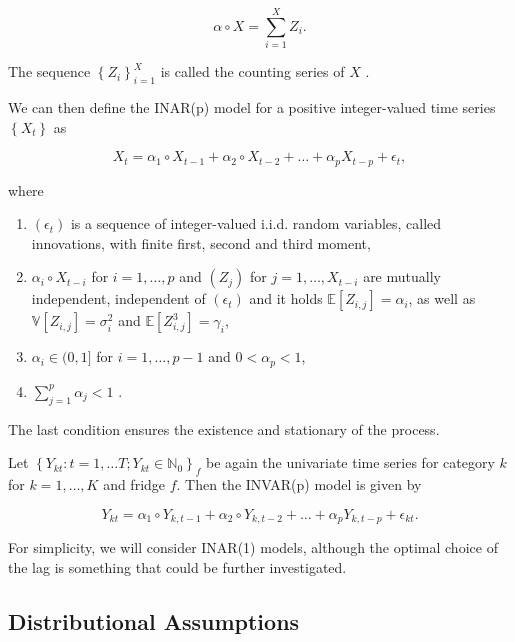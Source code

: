 \begin{equation}
\alpha \circ X = \sum_{i=1}^X Z_i .
\label{eq:Thinning operator}
\end{equation}

The sequence  $\left\{Z_i \right\}_{i=1}^X$ is called the counting series of $X$ \cite{Silva:2005}. 

We can then define the INAR(p) model for a positive integer-valued time series $\left\{X_t \right\}$ as

\begin{equation}
X_t = \alpha_1 \circ X_{t-1} + \alpha_2 \circ X_{t-2} + \ldots + \alpha_p X_{t-p} +\epsilon_t ,
\label{eq:Inar(p) model}
\end{equation}

where

\begin{enumerate}
	\item $(\epsilon_t)$ is a sequence of integer-valued i.i.d. random variables, called innovations, with finite first, second and third moment, 
	\item $\alpha_i \circ X_{t-i}$ for $i= 1,\ldots,p$ and $(Z_j)$ for $j=1,\ldots,X_{t-i}$ are mutually independent, independent of $(\epsilon_t)$ and it holds $\mathbb{E}[Z_{i,j}]=\alpha_i$, as well as $\mathbb{V}[Z_{i,j}] = \sigma_i^2$ and $\mathbb{E}[Z_{i,j}^3] = \gamma_i$,
	\item $\alpha_i \in (0,1]$ for $i=1,\ldots,p-1$ and $0 < \alpha_p < 1$,
	\item $\sum_{j=1}^p \alpha_j < 1$ \cite{Silva:2005}. 
\end{enumerate}


The last condition ensures the existence and stationary of the process. 

Let $\left\{Y_{kt}:t=1,\ldots T; Y_{kt} \in \mathbb{N}_0\right\}_f$ be again the univariate time series for category $k$ for $k=1,\ldots,K$ and fridge $f$. Then the INVAR(p) model is given by

\begin{equation}
Y_{kt} = \alpha_1 \circ Y_{k,t-1} + \alpha_2 \circ Y_{k,t-2} + \ldots + \alpha_p Y_{k,t-p} +\epsilon_{kt}.
\label{eq:Inar(p) model ts}
\end{equation}

For simplicity, we will consider INAR(1) models, although the optimal choice of the lag is something that could be further investigated. 

\subsection{Distributional Assumptions}
\label{sec: Inar Distributional assumptions}

